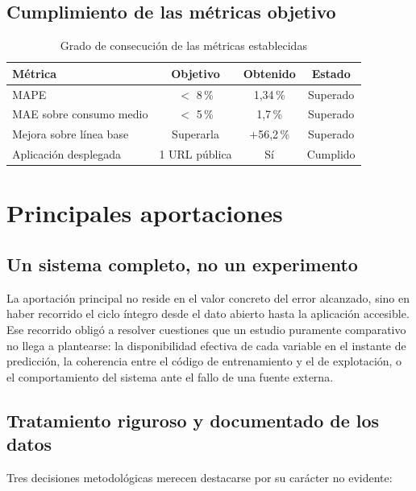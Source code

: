 \subsection*{Cumplimiento de las métricas objetivo}

\begin{table}[H]
\centering
\caption{Grado de consecución de las métricas establecidas}
\label{tab:objetivos}
\begin{tabular}{|l|c|c|c|}
\hline
\rowcolor{grisclaro}
\textbf{Métrica} & \textbf{Objetivo} & \textbf{Obtenido} & \textbf{Estado} \\
\hline
MAPE & $<$ 8\,\% & 1,34\,\% & Superado \\
\hline
MAE sobre consumo medio & $<$ 5\,\% & 1,7\,\% & Superado \\
\hline
Mejora sobre línea base & Superarla & $+$56,2\,\% & Superado \\
\hline
Aplicación desplegada & 1 URL pública & Sí & Cumplido \\
\hline
\end{tabular}
\end{table}


\section{Principales aportaciones}

\subsection*{Un sistema completo, no un experimento}

La aportación principal no reside en el valor concreto del error alcanzado, sino
en haber recorrido el ciclo íntegro desde el dato abierto hasta la aplicación
accesible. Ese recorrido obligó a resolver cuestiones que un estudio puramente
comparativo no llega a plantearse: la disponibilidad efectiva de cada variable en
el instante de predicción, la coherencia entre el código de entrenamiento y el de
explotación, o el comportamiento del sistema ante el fallo de una fuente externa.

\subsection*{Tratamiento riguroso y documentado de los datos}

Tres decisiones metodológicas merecen destacarse por su carácter no evidente:

